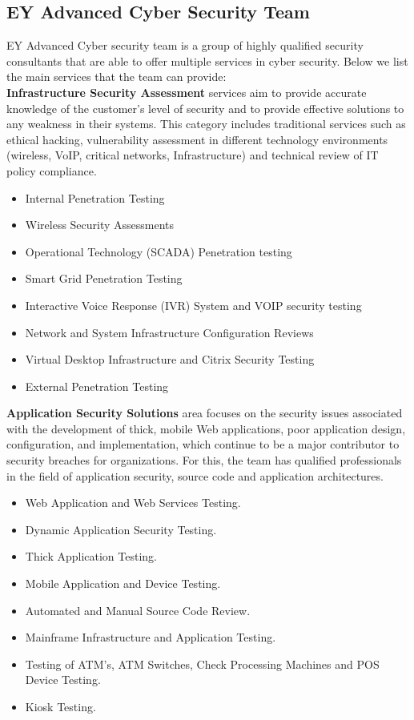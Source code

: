 \subsection{EY Advanced Cyber Security Team}
EY Advanced Cyber security team is a group of highly qualified security consultants that are able to offer multiple services in cyber security. Below we list the main services that the team can provide:\\
\textbf{Infrastructure Security Assessment} services aim to provide accurate knowledge of the customer's level of security and to provide effective solutions to any weakness in their systems. This category includes traditional services such as ethical hacking, vulnerability assessment in different technology environments (wireless, VoIP, critical networks, Infrastructure) and technical review of IT policy compliance.
\begin{itemize}
    \item Internal Penetration Testing
    \item Wireless Security Assessments
    \item Operational Technology (SCADA) Penetration testing
    \item Smart Grid Penetration Testing
    \item Interactive Voice Response (IVR) System and VOIP security testing
    \item Network and System Infrastructure Configuration Reviews
    \item Virtual Desktop Infrastructure and Citrix Security Testing
    \item External Penetration Testing
\end{itemize}
\textbf{Application Security Solutions} area focuses on the security issues associated with the development of thick, mobile Web applications, poor application design, configuration, and implementation, which continue to be a major contributor to security breaches for organizations. For this, the team has qualified professionals in the field of application security, source code and application architectures.
\begin{itemize}
    \item Web Application and Web Services Testing.
    \item Dynamic Application Security Testing.
    \item Thick Application Testing.
    \item Mobile Application and Device Testing.
    \item Automated and Manual Source Code Review.
    \item Mainframe Infrastructure and Application Testing.
    \item Testing of ATM’s, ATM Switches, Check Processing Machines and POS Device Testing.
    \item Kiosk Testing.
\end{itemize}
